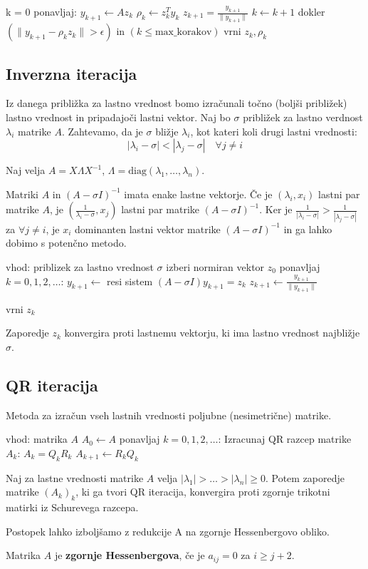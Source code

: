 \begin{multicols}{5}
\begin{koda}
k = 0
ponavljaj:
    $y_{k+1} \leftarrow A z_k$
    $\rho_k \leftarrow z_k^T y_k$
    $z_{k+1} = \frac{y_{k+1}}{\| y_{k+1} \|}$
    $k \leftarrow k + 1$
dokler $(\| y_{k+1} - \rho_k z_k \| > \epsilon )$ in $(k \leq \text{max\_korakov})$
vrni $z_k, \rho_k$
\end{koda}

\subsection*{Inverzna iteracija}
Iz danega približka za lastno vrednost bomo izračunali točno (boljši približek) lastno vrednost in pripadajoči lastni vektor.
Naj bo $\sigma$ približek za lastno verdnost $\lambda_i$ matrike $A$. Zahtevamo, da je $\sigma$ bližje $\lambda_i$, kot kateri koli drugi lastni vrednosti:
\[ |\lambda_i - \sigma | < |\lambda_j - \sigma| \quad \forall j \neq i\]

Naj velja $A = X \Lambda X^{-1}$, $\Lambda = \text{diag}(\lambda_1, \dots, \lambda_n)$.

Matriki $A$ in $(A-\sigma I)^{-1}$ imata enake lastne vektorje. Če je $(\lambda_i, x_i)$ lastni par matrike $A$, je $(\frac{1}{\lambda_i - \sigma}, x_j)$ lastni par matrike $(A-\sigma I)^{-1}$.
Ker je $\frac{1}{|\lambda_i - \sigma|} > \frac{1}{|\lambda_j - \sigma|}$ za $\forall j \neq i$, je $x_i$ dominanten lastni vektor matrike $(A-\sigma I)^{-1}$ in ga lahko dobimo s potenčno metodo.
%

\begin{koda}
vhod: priblizek za lastno vrednost $\sigma$
izberi normiran vektor $z_0$
ponavljaj $k=0, 1, 2, \dots$:
    $y_{k+1} \leftarrow $ resi sistem $(A-\sigma I) y_{k+1} = z_k$
    $z_{k+1} \leftarrow \frac{y_{k+1}}{\| y_{k+1} \|}$

vrni $z_k$
\end{koda}

Zaporedje $z_k$ konvergira proti lastnemu vektorju, ki ima lastno vrednost najbližje $\sigma$.


\subsection*{QR iteracija}
Metoda za izračun vseh lastnih vrednosti poljubne (nesimetrične) matrike.

\begin{koda}
vhod: matrika $A$
$A_0 \leftarrow A$
ponavljaj $k = 0, 1, 2, \dots$:
    Izracunaj QR razcep matrike $A_k$: $A_k = Q_k R_k$
    $A_{k+1} \leftarrow R_k Q_k$
\end{koda}

Naj za lastne vrednosti matrike $A$ velja $|\lambda_1| > \dots > |\lambda_n| \geq 0$. Potem
zaporedje matrike $(A_k)_k$, ki ga tvori QR iteracija, konvergira proti zgornje trikotni matirki iz Schurevega razcepa.

Postopek lahko izboljšamo z redukcije A na zgornje Hessenbergovo obliko.

Matrika $A$ je \textbf{zgornje Hessenbergova}, če je $a_{ij} = 0$ za $i \geq j+2$.
\end{multicols}

